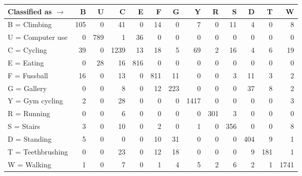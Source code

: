 \begin{tabular}{lrrrrrrrrrrrr}
\toprule
Classified as $\rightarrow$ &    B &    U &     C &    E &    F &    G &     Y &    R &    S &    D &    T &     W \\
\midrule
B = Climbing      &  105 &    0 &    41 &    0 &   14 &    0 &     7 &    0 &   11 &    4 &    0 &     8 \\
U = Computer use  &    0 &  789 &     1 &   36 &    0 &    0 &     0 &    0 &    0 &    0 &    0 &     0 \\
C = Cycling       &   39 &    0 &  1239 &   13 &   18 &    5 &    69 &    2 &   16 &    4 &    6 &    19 \\
E = Eating        &    0 &   28 &    16 &  816 &    0 &    0 &     0 &    0 &    0 &    0 &    0 &     0 \\
F = Fussball      &   16 &    0 &    13 &    0 &  811 &   11 &     0 &    0 &    3 &   11 &    3 &     2 \\
G = Gallery       &    0 &    0 &     8 &    0 &   12 &  223 &     0 &    0 &    0 &   37 &    8 &     2 \\
Y = Gym cycling   &    2 &    0 &    28 &    0 &    0 &    0 &  1417 &    0 &    0 &    0 &    0 &     3 \\
R = Running       &    0 &    0 &     6 &    0 &    0 &    0 &     0 &  301 &    3 &    0 &    0 &     0 \\
S = Stairs        &    3 &    0 &    10 &    0 &    2 &    0 &     1 &    0 &  356 &    0 &    0 &     8 \\
D = Standing      &    5 &    0 &     0 &    0 &   10 &   31 &     0 &    0 &    0 &  404 &    9 &     1 \\
T = Teethbrushing &    0 &    0 &    23 &    0 &   12 &   18 &     0 &    0 &    0 &    9 &  181 &     1 \\
W = Walking       &    1 &    0 &     7 &    0 &    1 &    4 &     5 &    2 &    6 &    2 &    1 &  1741 \\
\bottomrule
\end{tabular}
